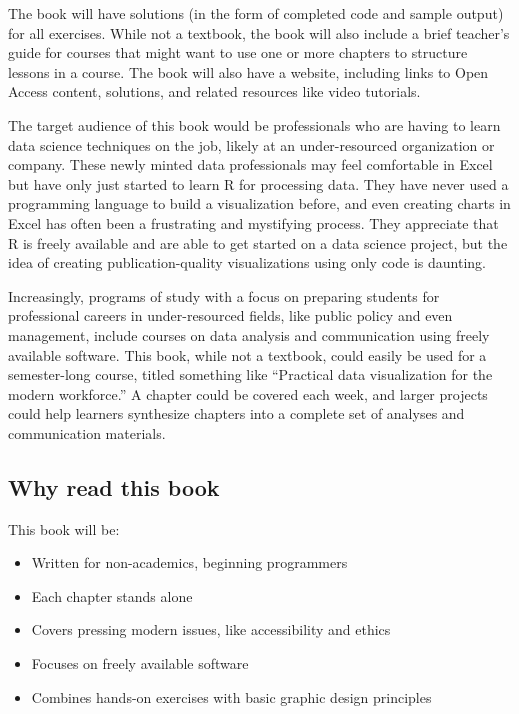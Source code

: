 \documentclass[
]{krantz}
\providecommand{\tightlist}{%
  \setlength{\itemsep}{0pt}\setlength{\parskip}{0pt}}
\begin{document}
The book will have solutions (in the form of completed code and sample output) for all exercises. While not a textbook, the book will also include a brief teacher's guide for courses that might want to use one or more chapters to structure lessons in a course. The book will also have a website, including links to Open Access content, solutions, and related resources like video tutorials.

The target audience of this book would be professionals who are having to learn data science techniques on the job, likely at an under-resourced organization or company. These newly minted data professionals may feel comfortable in Excel but have only just started to learn R for processing data. They have never used a programming language to build a visualization before, and even creating charts in Excel has often been a frustrating and mystifying process. They appreciate that R is freely available and are able to get started on a data science project, but the idea of creating publication-quality visualizations using only code is daunting.

Increasingly, programs of study with a focus on preparing students for professional careers in under-resourced fields, like public policy and even management, include courses on data analysis and communication using freely available software. This book, while not a textbook, could easily be used for a semester-long course, titled something like ``Practical data visualization for the modern workforce.'' A chapter could be covered each week, and larger projects could help learners synthesize chapters into a complete set of analyses and communication materials.

\hypertarget{why-read-this-book}{%
\subsection*{Why read this book}\label{why-read-this-book}}


This book will be:

\begin{itemize}
\tightlist
\item
  Written for non-academics, beginning programmers
\item
  Each chapter stands alone
\item
  Covers pressing modern issues, like accessibility and ethics
\item
  Focuses on freely available software
\item
  Combines hands-on exercises with basic graphic design principles
\end{itemize}
\end{document}
